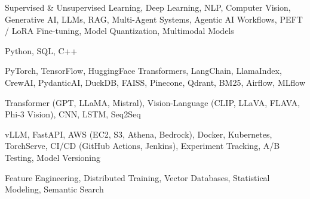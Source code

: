 \documentclass[letter,10pt]{article}
\begin{document}
 Supervised \& Unsupervised Learning, Deep Learning, NLP, Computer Vision, Generative AI, LLMs, RAG, Multi-Agent Systems, Agentic AI Workflows, PEFT / LoRA Fine-tuning, Model Quantization, Multimodal Models\par\vspace{2pt}

 Python, SQL, C++\par\vspace{2pt}

 PyTorch, TensorFlow, HuggingFace Transformers, LangChain, LlamaIndex, CrewAI, PydanticAI, DuckDB, FAISS, Pinecone, Qdrant, BM25, Airflow, MLflow\par\vspace{2pt}

 Transformer (GPT, LLaMA, Mistral), Vision-Language (CLIP, LLaVA, FLAVA, Phi-3 Vision), CNN, LSTM, Seq2Seq\par\vspace{2pt}

 vLLM, FastAPI, AWS (EC2, S3, Athena, Bedrock), Docker, Kubernetes, TorchServe, CI/CD (GitHub Actions, Jenkins), Experiment Tracking, A/B Testing, Model Versioning\par\vspace{2pt}

 Feature Engineering, Distributed Training, Vector Databases, Statistical Modeling, Semantic Search
\end{document}
